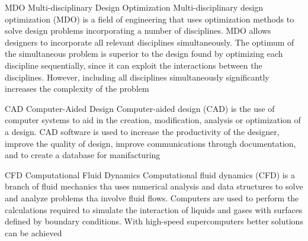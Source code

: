 %


  {MDO}                                                %
  {Multi-disciplinary Design Optimization}  %
  {Multi-disciplinary design optimization (MDO) is a field of engineering that uses optimization methods to solve design problems incorporating a number of disciplines. MDO allows designers to incorporate all relevant disciplines simultaneously. The optimum of the simultaneous problem is superior to the design found by optimizing each discipline sequentially, since it can exploit the interactions between the disciplines. However, including all disciplines simultaneously significantly increases the complexity of the problem}  %
  
  {CAD}                                                %
  {Computer-Aided Design}                    %
  {Computer-aided design (CAD) is the use of computer systems to aid in the creation, modification, analysis or optimization of a design. CAD software is used to increase the productivity of the designer, improve the quality of design, improve communications through documentation, and to create a database for manifacturing}                                     %

  {CFD}                                                %
  {Computational Fluid Dynamics}           %
  {Computational fluid dynamics (CFD) is a branch of fluid mechanics tha uses numerical analysis and data structures to solve and analyze problems tha involve fluid flows. Computers are used to perform the calculations required to simulate the interaction of liquids and gases with surfaces defined by boundary conditions. With high-speed supercomputers better solutions can be achieved}   %
  
